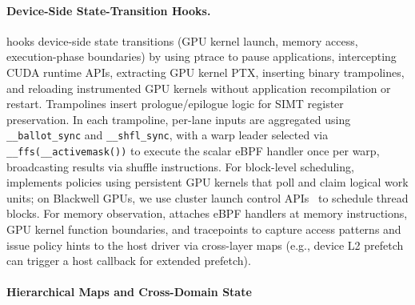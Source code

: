 \paragraph{Device-Side State-Transition Hooks.}
\sys hooks device-side state transitions (GPU kernel launch, memory access, execution-phase boundaries) by using ptrace to pause applications, intercepting CUDA runtime APIs, extracting GPU kernel PTX, inserting binary trampolines, and reloading instrumented GPU kernels without application recompilation or restart.
Trampolines insert prologue/epilogue logic for SIMT register preservation.
In each trampoline, per-lane inputs are aggregated using \texttt{\_\_ballot\_\allowbreak{}sync} and \texttt{\_\_shfl\_\allowbreak{}sync}, with a warp leader selected via \texttt{\_\_ffs\allowbreak{}(\_\_active\-mask())} to execute the scalar eBPF handler once per warp, broadcasting results via shuffle instructions.
For block-level scheduling, \sys implements policies using persistent GPU kernels that poll and claim logical work units; on Blackwell GPUs, we use cluster launch control APIs~\cite{cuda-clc} to schedule thread blocks.
For memory observation, \sys attaches eBPF handlers at memory instructions, GPU kernel function boundaries, and tracepoints to capture access patterns and issue policy hints to the host driver via cross-layer maps (e.g., device L2 prefetch can trigger a host callback for extended prefetch).

\paragraph{Hierarchical Maps and Cross-Domain State}

